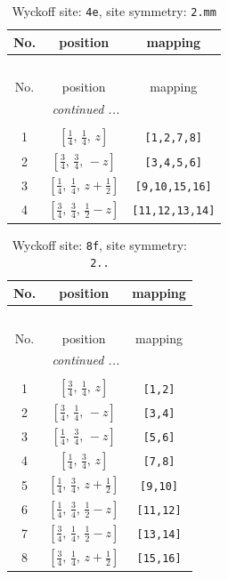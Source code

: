 \documentclass[fleqn,8pt]{jsarticle}
\begin{document}
\renewcommand{\arraystretch}{1.2}
\begin{longtable}{ccc}
\caption{Wyckoff site: {\tt 4e}, site symmetry: {\tt 2.mm}}
 \\
 \hline \hline
No. & position & mapping \\ \hline \endfirsthead

\multicolumn{2}{l}{\tablename\ \thetable{}} \\
 \hline \hline
No. & position & mapping \\ \hline \endhead

 \hline \hline
\multicolumn{2}{r}{\footnotesize\it continued ...} \\ \endfoot

 \hline \hline
\multicolumn{2}{r}{} \\ \endlastfoot

1 & $\left[ \frac{1}{4},\, \frac{1}{4},\, z \right]$ & {\tt [1,2,7,8]} \\ \hline
2 & $\left[ \frac{3}{4},\, \frac{3}{4},\, - z \right]$ & {\tt [3,4,5,6]} \\ \hline
3 & $\left[ \frac{1}{4},\, \frac{1}{4},\, z + \frac{1}{2} \right]$ & {\tt [9,10,15,16]} \\ \hline
4 & $\left[ \frac{3}{4},\, \frac{3}{4},\, \frac{1}{2} - z \right]$ & {\tt [11,12,13,14]} \\
\end{longtable}
\renewcommand{\arraystretch}{1.2}
\begin{longtable}{ccc}
\caption{Wyckoff site: {\tt 8f}, site symmetry: {\tt 2..}}
 \\
 \hline \hline
No. & position & mapping \\ \hline \endfirsthead

\multicolumn{2}{l}{\tablename\ \thetable{}} \\
 \hline \hline
No. & position & mapping \\ \hline \endhead

 \hline \hline
\multicolumn{2}{r}{\footnotesize\it continued ...} \\ \endfoot

 \hline \hline
\multicolumn{2}{r}{} \\ \endlastfoot

1 & $\left[ \frac{3}{4},\, \frac{1}{4},\, z \right]$ & {\tt [1,2]} \\ \hline
2 & $\left[ \frac{3}{4},\, \frac{1}{4},\, - z \right]$ & {\tt [3,4]} \\ \hline
3 & $\left[ \frac{1}{4},\, \frac{3}{4},\, - z \right]$ & {\tt [5,6]} \\ \hline
4 & $\left[ \frac{1}{4},\, \frac{3}{4},\, z \right]$ & {\tt [7,8]} \\ \hline
5 & $\left[ \frac{1}{4},\, \frac{3}{4},\, z + \frac{1}{2} \right]$ & {\tt [9,10]} \\ \hline
6 & $\left[ \frac{1}{4},\, \frac{3}{4},\, \frac{1}{2} - z \right]$ & {\tt [11,12]} \\ \hline
7 & $\left[ \frac{3}{4},\, \frac{1}{4},\, \frac{1}{2} - z \right]$ & {\tt [13,14]} \\ \hline
8 & $\left[ \frac{3}{4},\, \frac{1}{4},\, z + \frac{1}{2} \right]$ & {\tt [15,16]} \\
\end{longtable}
\end{document}
